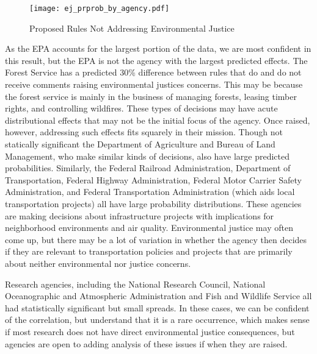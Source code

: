\begin{figure}[h!]
\caption{Proposed Rules Not Addressing Environmental Justice}
\texttt{[image: ej\_prprob\_by\_agency.pdf]}
\label{ejlogitagencies}

\end{figure}

As the EPA accounts for the largest portion of the data, we are most confident in this result, but the EPA is not the agency with the largest predicted effects. The Forest Service has a predicted 30\% difference between rules that do and do not receive comments raising environmental justices concerns. This may be because the forest service is mainly in the business of managing forests, leasing timber rights, and controlling wildfires. These types of decisions may have acute distributional effects that may not be the initial focus of the agency. Once raised, however, addressing such effects fits squarely in their mission. Though not statically significant the Department of Agriculture and Bureau of Land Management, who make similar kinds of decisions, also have large predicted probabilities. Similarly, the Federal Railroad Administration, Department of Transportation, Federal Highway Administration, Federal Motor Carrier Safety Administration, and Federal Transportation Administration (which aids local transportation projects) all have large probability distributions. These agencies are making decisions about infrastructure projects with implications for neighborhood environments and air quality. Environmental justice may often come up, but there may be a lot of variation in whether the agency then decides if they are relevant to transportation policies and projects that are primarily about neither environmental nor justice concerns. 

Research agencies, including the National Research Council, National Oceanographic and Atmospheric Administration and Fish and Wildlife Service all had statistically significant but small spreads. In these cases, we can be confident of the correlation, but understand that it is a rare occurrence, which makes sense if most research does not have direct environmental justice consequences, but agencies are open to adding analysis of these issues if when they are raised. 

